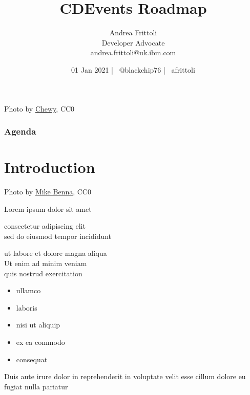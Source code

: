 \documentclass[aspectratio=169,11pt,hyperref={colorlinks=true}]{beamer}
\title{CDEvents Roadmap}
\date[01 Jan 2021]{01 Jan 2021 | \faTwitter ~@blackchip76 | \faGithub ~afrittoli}
\author[Andrea Frittoli]{%
  Andrea Frittoli \\
  Developer Advocate \\
  andrea.frittoli@uk.ibm.com \\
}
\begin{document}
\begin{frame}
\titlepage{}
\end{frame}

\begin{lpicrblack}{%
  Photo by \href{https://unsplash.com/@chewy}{\underline{Chewy}}, CC0
  }%
  {%
  \tableofcontents
  }%
  {}
  \frametitle{Agenda}
\end{lpicrblack}

\section[Introduction]{Introduction}

\begin{sectionwithpic}{Photo by \href{https://unsplash.com/@mbenna}{\underline{Mike Benna}}, CC0}
\end{sectionwithpic}

\begin{stripedframe}%
  {%
  Lorem ipsum dolor sit amet
  }%
  {%
  consectetur adipiscing elit \\
  \vspace{0.03\textheight}
  sed do eiusmod tempor incididunt \\
  \vspace{0.1\textheight}
  \centering
  
  }%
  {%
  ut labore et dolore magna aliqua \\
  \vspace{0.03\textheight}
  Ut enim ad minim veniam \\
  \vspace{0.03\textheight}
  quis nostrud exercitation
  }%
  {%
  \begin{itemize}
    \item ullamco
    \item laboris
  \end{itemize}
  \vspace{0.01\textheight}
  \begin{itemize}
    \item nisi ut aliquip
    \item ex ea commodo
    \item consequat
  \end{itemize}
  }%
  {%
  Duis aute irure dolor in reprehenderit in voluptate velit esse cillum dolore eu fugiat nulla pariatur
  }%
\end{stripedframe}
\end{document}
